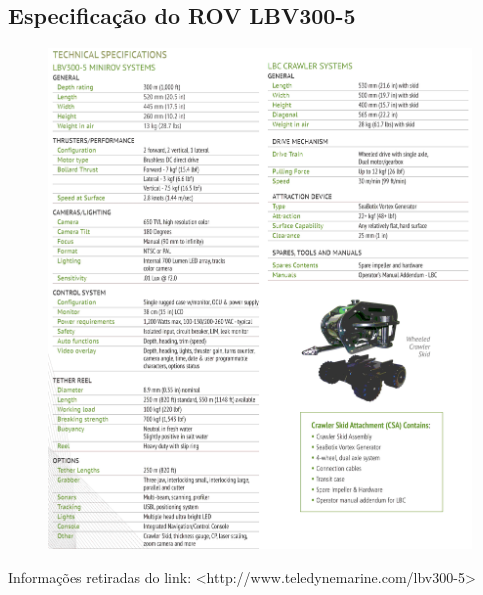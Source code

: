 \begin{anexosenv}
\partanexos

\chapter{Especificação do ROV LBV300-5}
\label{chap:especificacao_rov}
\begin{figure}[H]
    \centering
    \includegraphics[scale=0.38]{dados/figuras/especificacao_rov.png}
\end{figure}

Informações retiradas do link: <http://www.teledynemarine.com/lbv300-5>


\end{anexosenv}
